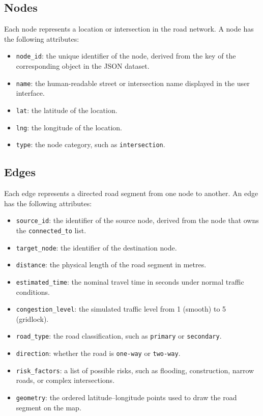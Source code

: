 \documentclass[12pt,a4paper,oneside]{report}
\newcommand{\code}[1]{\texttt{#1}}
\begin{document}
\subsection{Nodes}
Each node represents a location or intersection in the road network. A node has
the following attributes:
\begin{itemize}
\item \code{node\_id}: the unique identifier of the node, derived from the key
of the corresponding object in the JSON dataset.
\item \code{name}: the human-readable street or intersection name displayed in
the user interface.
\item \code{lat}: the latitude of the location.
\item \code{lng}: the longitude of the location.
\item \code{type}: the node category, such as \code{intersection}.
\end{itemize}

\subsection{Edges}
Each edge represents a directed road segment from one node to another. An edge
has the following attributes:
\begin{itemize}
\item \code{source\_id}: the identifier of the source node, derived from the
node that owns the \code{connected\_to} list.
\item \code{target\_node}: the identifier of the destination node.
\item \code{distance}: the physical length of the road segment in metres.
\item \code{estimated\_time}: the nominal travel time in seconds under normal
traffic conditions.
\item \code{congestion\_level}: the simulated traffic level from 1 (smooth) to
5 (gridlock).
\item \code{road\_type}: the road classification, such as \code{primary} or
\code{secondary}.
\item \code{direction}: whether the road is \code{one-way} or \code{two-way}.
\item \code{risk\_factors}: a list of possible risks, such as flooding,
construction, narrow roads, or complex intersections.
\item \code{geometry}: the ordered latitude--longitude points used to draw the
road segment on the map.
\end{itemize}
\end{document}
